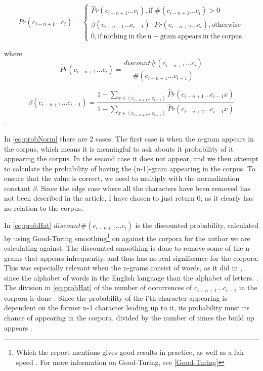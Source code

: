 \begin{equation}
\label{eq:probNorm}
Pr(c_{i - n + 1} \ldots c_{i}) = \left\{
\begin{array}{rl}
\hat{P}r(c_{i - n + 1} \ldots c_{i}), \text{if } \#(c_{i - n + 1} \ldots c_{i}) > 0\\
\beta(c_{i - n + 1} \ldots c_{i-1}) \cdot Pr(c_{i - n + 2} \ldots c_{i}), \mathrm{otherwise}\\
0, \mathrm{if\ nothing\ in\ the\ n-gram\ appears\ in\ the\ corpus}
\end{array} \right.
\end{equation}

where 
\begin{equation}
\label{eq:probHat}
\hat{P}r(c_{i - n + 1} \ldots c_{i}) = \frac{discount \#(c_{i - n + 1} \ldots c_{i})}{\#(c_{i - n + 1} \ldots c_{i-1})}
\end{equation}

\begin{equation}
\label{eq:beta}
\beta(c_{i - n + 1} \ldots c_{i-1}) = 
\frac
{1 - \sum_{x \in (c_{i - n + 1} \ldots c_{i-1})}\hat{P}r(c_{i - n + 1} \ldots c_{i-1} x)}
{1 - \sum_{x \in (c_{i - n + 1} \ldots c_{i-1})}\hat{P}r(c_{i - n + 2} \ldots c_{i-1} x)}
\end{equation}.

In \ref{eq:probNorm} there are 2 cases. The first case is when the n-gram appears in the corpus, which means it is meaningful to ask abouts it probability of it appearing the corpus. In the second case it does not appear, and we then attempt to calculate the probability of having the (n-1)-gram appearing in the corpus. To ensure that the value is correct, we need to multiply with the normalization constant $\beta$. Since the edge case where all the characters have been removed has not been described in the article, I have chosen to just return 0, as it clearly has no relation to the corpus.

In \ref{eq:probHat} $discount\#(c_{i - n + 1} \ldots c_{i})$ 
is the discounted probability, calculated by using Good-Turing smoothing\footnote{Which the report mentions gives good results in practice, as well as a fair speed \cite{nr4}. For more information on Good-Turing, see \ref{Good-Turing}} on against the corpora for the author we are calculating against. The discounted smoothing is done to remove some of the n-grams that appears infrequently, and thus has no real significance for the corpora. This was especially relevant when the n-grams consist of words, as it did in \cite{nr4}, since the alphabet of words in the English language than the alphabet of letters. . The division in \ref{eq:probHat} of the number of occurrences of $c_{i - n + 1} \ldots c_{i - 1}$ in the corpora is done . Since the probability of the i'th character appearing is dependent on the former n-1 character leading up to it, its probability must its chance of appearing in the corpora, divided by the number of times the build up appears .\\

